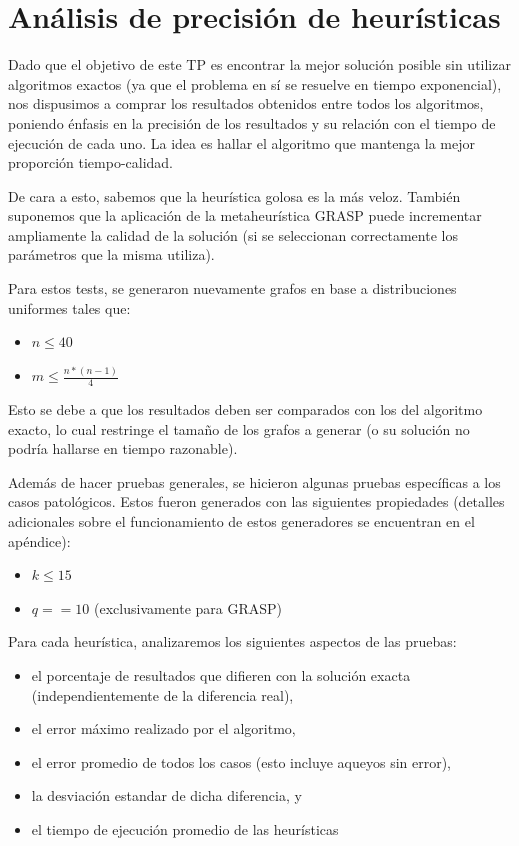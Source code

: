 \section{Análisis de precisión de heurísticas}

Dado que el objetivo de este TP es encontrar la mejor solución posible sin utilizar algoritmos exactos (ya que el problema en sí se resuelve en tiempo exponencial), nos dispusimos a comprar los resultados obtenidos entre todos los algoritmos, poniendo énfasis en la precisión de los resultados y su relación con el tiempo de ejecución de cada uno. La idea es hallar el algoritmo que mantenga la mejor proporción tiempo-calidad.

De cara a esto, sabemos que la heurística golosa es la más veloz. También suponemos que la aplicación de la metaheurística GRASP puede incrementar ampliamente la calidad de la solución (si se seleccionan correctamente los parámetros que la misma utiliza).

Para estos tests, se generaron nuevamente grafos en base a distribuciones uniformes tales que:

\begin{itemize}
	\item $n \leq 40$
	\item $m \leq \frac{n * (n-1)}{4}$
\end{itemize}

Esto se debe a que los resultados deben ser comparados con los del algoritmo exacto, lo cual restringe el tamaño de los grafos a generar (o su solución no podría hallarse en tiempo razonable).

Además de hacer pruebas generales, se hicieron algunas pruebas específicas a los casos patológicos. Estos fueron generados con las siguientes propiedades (detalles adicionales sobre el funcionamiento de estos generadores se encuentran en el apéndice):

\begin{itemize}
    \item $k \leq 15$
    \item $q == 10$ (exclusivamente para GRASP)
\end{itemize}

Para cada heurística, analizaremos los siguientes aspectos de las pruebas:

\begin{itemize}
	\item el porcentaje de resultados que difieren con la solución exacta (independientemente de la diferencia real),
	\item el error máximo realizado por el algoritmo,
	\item el error promedio de todos los casos (esto incluye aqueyos sin error),
	\item la desviación estandar de dicha diferencia, y
    \item el tiempo de ejecución promedio de las heurísticas
\end{itemize}

